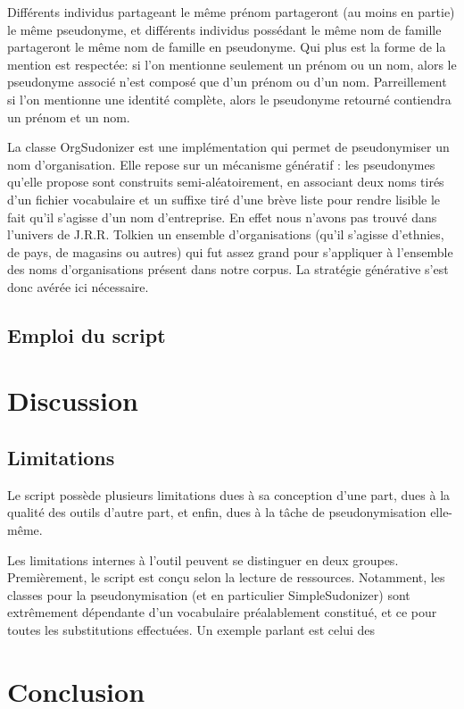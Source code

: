 \documentclass{article}
\begin{document}
Différents individus partageant le même prénom partageront (au moins en partie) le même pseudonyme, et différents individus possédant le même nom de famille partageront le même nom de famille en pseudonyme.
Qui plus est la forme de la mention est respectée: si l'on mentionne seulement un prénom ou un nom, alors le pseudonyme associé n'est composé que d'un prénom ou d'un nom.
Parreillement si l'on mentionne une identité complète, alors le pseudonyme retourné contiendra un prénom et un nom.
\par
La classe OrgSudonizer est une implémentation qui permet de pseudonymiser un nom d'organisation.
Elle repose sur un mécanisme génératif : les pseudonymes qu'elle propose sont construits semi-aléatoirement, en associant deux noms tirés d'un fichier vocabulaire et un suffixe tiré d'une brève liste pour rendre lisible le fait qu'il s'agisse d'un nom d'entreprise.
En effet nous n'avons pas trouvé dans l'univers de J.R.R. Tolkien un ensemble d'organisations (qu'il s'agisse d'ethnies, de pays, de magasins ou autres) qui fut assez grand pour s'appliquer à l'ensemble des noms d'organisations présent dans notre corpus.
La stratégie générative s'est donc avérée ici nécessaire.

\subsection{Emploi du script}

\section{Discussion}
\subsection{Limitations}
\par
Le script possède plusieurs limitations dues à sa conception d'une part, dues à la qualité des outils d'autre part, et enfin, dues à la tâche de pseudonymisation elle-même.
\par
Les limitations internes à l'outil peuvent se distinguer en deux groupes.
Premièrement, le script est conçu selon la lecture de ressources.
Notamment, les classes pour la pseudonymisation (et en particulier SimpleSudonizer) sont extrêmement dépendante d'un vocabulaire préalablement constitué, et ce pour toutes les substitutions effectuées.
Un exemple parlant est celui des 

\section{Conclusion}
\end{document}
